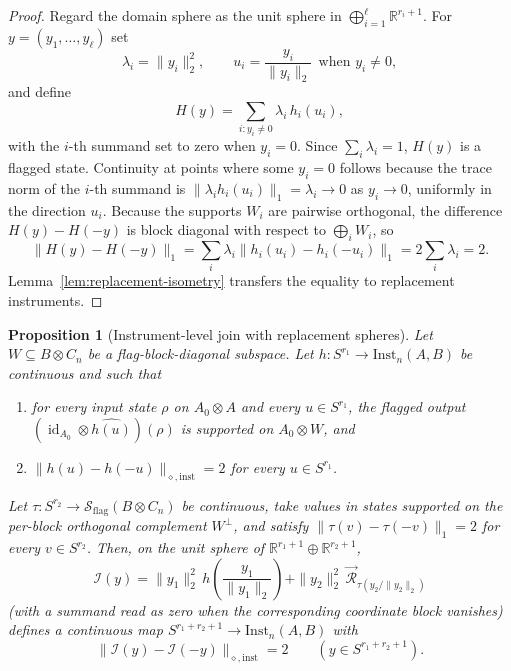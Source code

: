\documentclass[11pt,a4paper]{article}
\newtheorem{proposition}[theorem]{Proposition}
\newcommand{\Sstate}{\mathcal{S}}
\newcommand{\Inst}{\mathrm{Inst}}
\newcommand{\id}{\operatorname{id}}
\begin{document}
\begin{proof}
Regard the domain sphere as the unit sphere in $\bigoplus_{i=1}^{\ell}\mathbb R^{r_i+1}$. For $y=(y_1,\dots,y_\ell)$ set
\[
\lambda_i=\|y_i\|_2^2,\qquad
u_i=\frac{y_i}{\|y_i\|_2}\ \ \text{when }y_i\neq0,
\]
and define
\[
H(y)=\sum_{i:y_i\neq0}\lambda_i\,h_i(u_i),
\]
with the $i$-th summand set to zero when $y_i=0$. Since $\sum_i\lambda_i=1$, $H(y)$ is a flagged state. Continuity at points where some $y_i=0$ follows because the trace norm of the $i$-th summand is $\|\lambda_i h_i(u_i)\|_1=\lambda_i\to0$ as $y_i\to0$, uniformly in the direction $u_i$. Because the supports $W_i$ are pairwise orthogonal, the difference $H(y)-H(-y)$ is block diagonal with respect to $\bigoplus_iW_i$, so
\[
\|H(y)-H(-y)\|_1
=\sum_i\lambda_i\|h_i(u_i)-h_i(-u_i)\|_1
=2\sum_i\lambda_i=2.
\]
Lemma~\ref{lem:replacement-isometry} transfers the equality to replacement instruments.
\end{proof}

\begin{proposition}[Instrument-level join with replacement spheres]
\label{prop:join-inst}
Let $W\subseteq B\otimes C_n$ be a flag-block-diagonal subspace. Let $h:S^{r_1}\to\Inst_n(A,B)$ be continuous and such that
\begin{enumerate}[leftmargin=*,itemsep=2pt]
\item for every input state $\rho$ on $A_0\otimes A$ and every $u\in S^{r_1}$, the flagged output $(\id_{A_0}\otimes\widehat{h(u)})(\rho)$ is supported on $A_0\otimes W$, and
\item $\|h(u)-h(-u)\|_{\diamond,\mathrm{inst}}=2$ for every $u\in S^{r_1}$.
\end{enumerate}
Let $\tau:S^{r_2}\to\Sstate_{\mathrm{flag}}(B\otimes C_n)$ be continuous, take values in states supported on the per-block orthogonal complement $W^{\perp}$, and satisfy $\|\tau(v)-\tau(-v)\|_1=2$ for every $v\in S^{r_2}$. Then, on the unit sphere of $\mathbb R^{r_1+1}\oplus\mathbb R^{r_2+1}$,
\[
\mathcal I(y)=\|y_1\|_2^2\,h\!\left(\frac{y_1}{\|y_1\|_2}\right)
+\|y_2\|_2^2\,\vec{\mathcal R}_{\tau(y_2/\|y_2\|_2)}
\]
(with a summand read as zero when the corresponding coordinate block vanishes) defines a continuous map $S^{r_1+r_2+1}\to\Inst_n(A,B)$ with
\[
\|\mathcal I(y)-\mathcal I(-y)\|_{\diamond,\mathrm{inst}}=2\qquad(y\in S^{r_1+r_2+1}).
\]
\end{proposition}
\end{document}
